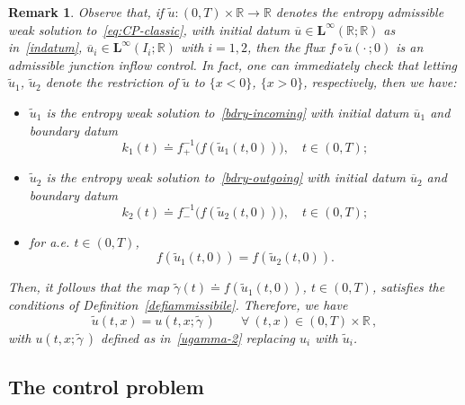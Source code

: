\documentclass[a4paper, 10pt, final]{article}
\newtheorem{remark}{Remark}[section]
\newcommand{\R}{\mathbb{R}} \newcommand{\N}{\mathbb{N}}
\begin{document}
\begin{remark}
\label{rem:entr-sol}
Observe that, if $\widetilde u : (0,T)\times\R\to \R$ denotes the 
entropy admissible weak solution
to~\eqref{eq:CP-classic}, with initial datum
$\overline u\in 
  \mathbf{L^\infty}(\R;\R)$
  as in~\eqref{indatum}, 
  $\overline u_i\in  \mathbf{L^\infty}(I_i; \R)$ with $i=1, 2$,
then the flux $f\circ \widetilde u(\cdot\,;0)$ is an admissible junction inflow control.
In fact, one can immediately check that
letting $\widetilde u_1$, $\widetilde u_2$ denote the restriction of $\widetilde u$ to $\{x<0\}$, $\{x>0\}$,
respectively, then we have:
\begin{itemize}
[leftmargin=14pt]
    \item[-]
    $\widetilde u_1$ is the entropy weak solution to~\eqref{bdry-incoming} with initial datum $\overline u_1$ and boundary datum
    \begin{equation*}
        k_1(t)\doteq f_+^{-1}\big(f(\widetilde u_1(t,0))\big),
        \quad t\in (0,T);
    \end{equation*}
    \item[-]
    $\widetilde u_2$ is the entropy weak solution to~\eqref{bdry-outgoing} with initial datum $\overline u_2$ and boundary datum
    \begin{equation*}
        k_2(t)\doteq f_-^{-1}\big(f(\widetilde u_2(t,0))\big),
        \quad t\in (0,T);
    \end{equation*}
    \item[-] for a.e. $t \in (0, T)$,
    \begin{equation}
    f(\widetilde u_1(t,0))=
   f(\widetilde u_2(t, 0)). 
  \end{equation}
    \end{itemize}
Then, it follows that the map $\widetilde \gamma(t)\doteq f(\widetilde u_1(t,0))$, $t\in(0,T)$, 
satisfies the conditions of Definition~\ref{defiammissibile}.
Therefore, we have 
\begin{equation*}
    \widetilde u(t,x) = u(t,x;\widetilde\gamma\,)
    \qquad\forall~(t,x)\in (0,T)\times\R\,,
\end{equation*}
with $u(t,x;\widetilde\gamma\,)$ defined as in~\eqref{ugamma-2} replacing $u_i$ with $\widetilde u_i$.
\end{remark}

 
 
 
\subsection{The control problem}
\end{document}
